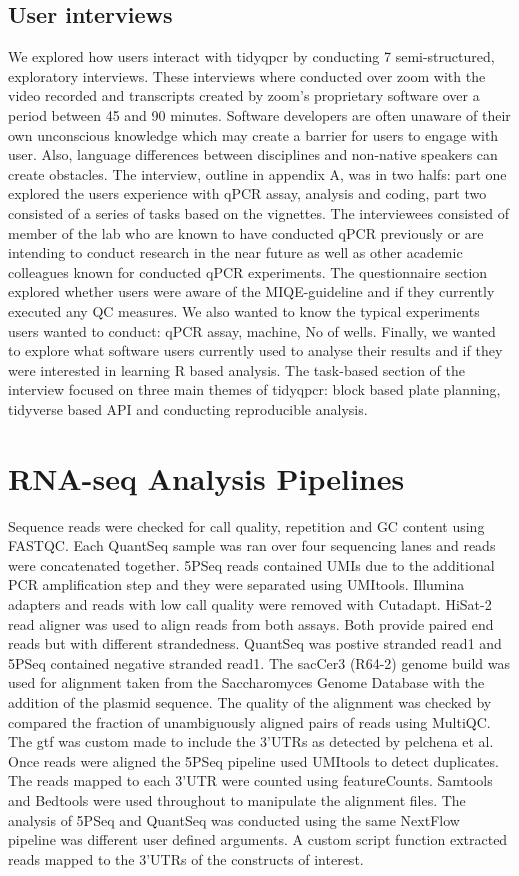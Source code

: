 \documentclass{SBCbookchapter}
\begin{document}
\subsection{User interviews}
We explored how users interact with tidyqpcr by conducting 7 semi-structured, exploratory interviews. These interviews where conducted over zoom with the video recorded and transcripts created by zoom's proprietary software over a period between 45 and 90 minutes. Software developers are often unaware of their own unconscious knowledge which may create a barrier for users to engage with user. Also, language differences between disciplines and non-native speakers can create obstacles.  The interview, outline in appendix A, was in two halfs: part one explored the users experience with qPCR assay, analysis and coding, part two consisted of a series of tasks based on the vignettes. The interviewees consisted of member of the lab who are known to have conducted qPCR previously or are intending to conduct research in the near future as well as other academic colleagues known for conducted qPCR experiments. The questionnaire section explored whether users were aware of the MIQE-guideline and if they currently executed any QC measures. We also wanted to know the typical experiments users wanted to conduct: qPCR assay, machine, No of wells. Finally, we wanted to explore what software users currently used to analyse their results and if they were interested in learning R based analysis. The task-based section of the interview focused on three main themes of tidyqpcr: block based plate planning, tidyverse based API and conducting reproducible analysis.

\section{RNA-seq Analysis Pipelines}

Sequence reads were checked for call quality, repetition and GC content using FASTQC. Each QuantSeq sample was ran over four sequencing lanes and reads were concatenated together. 5PSeq reads contained UMIs due to the additional PCR amplification step and they were separated using UMItools. Illumina adapters and reads with low call quality were removed with Cutadapt. HiSat-2 read aligner was used to align reads from both assays. Both provide paired end reads but with different strandedness. QuantSeq was postive stranded read1 and 5PSeq contained negative stranded read1. The sacCer3 (R64-2) genome build was used for alignment taken from the Saccharomyces Genome Database with the addition of the plasmid sequence. The quality of the alignment was checked by compared the fraction of unambiguously aligned pairs of reads using MultiQC. The gtf was custom made to include the 3'UTRs as detected by pelchena et al. Once reads were aligned the 5PSeq pipeline used UMItools to detect duplicates. The reads mapped to each 3'UTR were counted using featureCounts. Samtools and Bedtools were used throughout to manipulate the alignment files. The analysis of 5PSeq and QuantSeq was conducted using the same NextFlow pipeline was different user defined arguments. A custom script function extracted reads mapped to the 3'UTRs of the constructs of interest.
\end{document}

